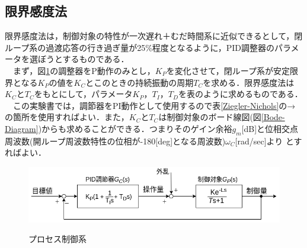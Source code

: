 \documentclass[12pt]{jsarticle}
\begin{document}
\subsection{限界感度法}
限界感度法は，制御対象の特性が一次遅れ＋むだ時間系に近似できるとして，閉ループ系の過渡応答の行き過ぎ量が25\%程度となるように，PID調整器のパラメータを選ぼうとするものである．\\
　まず，図\ref{processController}の調整器をP動作のみとし，$K_P$を変化させて，閉ループ系が安定限界となる$K_P$の値を$K_C$とこのときの持続振動の周期$T_C$を求める．限界感度法は$K_C$と$T_C$をもとにして，パラメータ$K_P$，$T_I$，$T_D$を表のように求めるものである．\\
　この実験書では，調節器をPI動作として使用するので表\ref{Ziegler-Nichols}の→の箇所を使用すればよい．また，$K_C$と$T_C$は制御対象のボード線図(図\ref{Bode-Diagram})からも求めることができる．つまりそのゲイン余裕$g_m$[dB]と位相交点周波数(開ループ周波数特性の位相が-180[deg]となる周波数)$\omega_C$[rad/sec]より
とすればよい．
\begin{table}[tb]
  \label{Ziegler-Nichols}
  \caption{Ziegler-Nicholsの限界感度法}
\end{table}
\begin{figure}[tb]
  \begin{center}
    \label{processController}
    \includegraphics{../img/2-A3.png}
    \caption{プロセス制御系}
  \end{center}
\end{figure}
\end{document}
